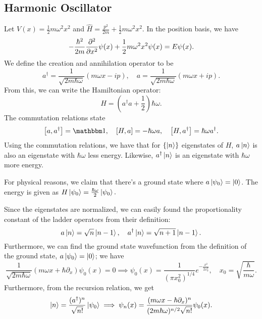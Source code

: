 \documentclass{article}
\begin{document}
\subsection{Harmonic Oscillator}
Let $V(x)=\frac 12m\omega^2x^2$ and $\hat H=\frac{p^2}{2m}+\frac 12m\omega^2x^2$. In the position basis, we have 
$$-\frac{\hbar^2}{2m}\frac{\partial^{2}}{\partial{x}^{2}}\psi(x)+\frac 12m\omega^2x^2\psi(x)=E\psi(x).$$
We define the creation and annihilation operator to be 
$$a^\dag=\frac 1{\sqrt{2m\hbar\omega}}(m\omega x-ip),\quad a=\frac 1{\sqrt{2m\hbar\omega}}(m\omega x+ip).$$
From this, we can write the Hamiltonian operator:
$$H=\left(a^\dag a+\frac 12\right)\hbar\omega.$$
The commutation relations state 
$$\comm{a}{a^\dag}=\mathbbm 1,\quad \comm{H}{a}=-\hbar\omega a,\quad\comm{H}{a^\dag}=\hbar\omega a^\dag.$$
Using the commutation relations, we have that for $\{\ket n\}$ eigenstates of $H$, $a\ket n$ is also an eigenstate with $\hbar\omega$ less energy. Likewise, $a^\dag\ket n$ is an eigenstate with $\hbar\omega$ more energy.

For physical reasons, we claim that there's a ground state where $a\ket{\psi_0}=\ket 0$. The energy is given as $H\ket{\psi_0}=\frac{\hbar\omega}2\ket{\psi_0}.$

Since the eigenstates are normalized, we can easily found the proportionality constant of the ladder operators from their definition:
$$a\ket n=\sqrt n\ket{n-1},\quad a^\dag\ket n=\sqrt{n+1}\ket{n-1}.$$
Furthermore, we can find the ground state wavefunction from the definition of the ground state, $a\ket{\psi_0}=\ket 0$; we have 
$$\frac 1{\sqrt{2m\hbar\omega}}(m\omega x+\hbar\partial_x)\psi_0(x)=0\implies \psi_0(x)=\frac{1}{(\pi x_0^2)^{1/4}}e^{-\frac{x^2}{2x_0^2}},\quad x_0=\sqrt{\frac\hbar{m\omega}}.$$
Furthermore, from the recursion relation, we get 
$$\ket n=\frac{(a^\dag)^n}{\sqrt{n!}}\ket{\psi_0}\implies\psi_n(x)=\frac{(m\omega x-\hbar\partial_x)^n}{(2m\hbar\omega)^{n/2}\sqrt{n!}}\psi_0(x).$$
\end{document}
